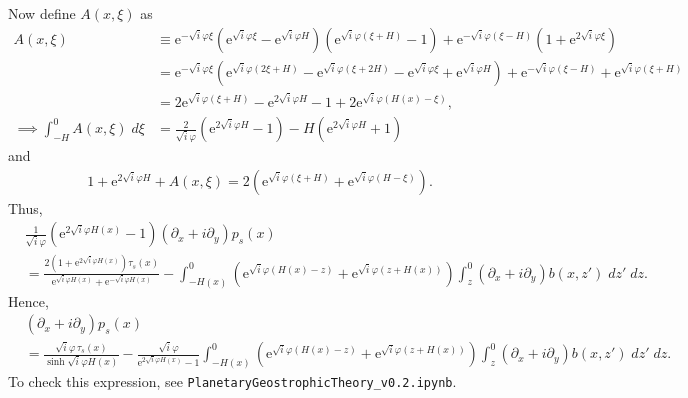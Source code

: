\documentclass[10pt]{amsart}
\begin{document}
Now define $A(x,\xi)$ as
\begin{align}
A(x,\xi) & \equiv \mathrm{e}^{-\sqrt{i} \varphi \xi} 
\left(
\mathrm{e}^{\sqrt{i} \varphi \xi} - 
\mathrm{e}^{\sqrt{i} \varphi H} 
\right) \left(
\mathrm{e}^{\sqrt{i} \varphi  \left( \xi + H \right)} - 1
\right) + \mathrm{e}^{-\sqrt{i} \varphi (\xi - H)  } 
\left( 1 + \mathrm{e}^{2 \sqrt{i} \varphi \xi}\right)   \nonumber \\
& =
\mathrm{e}^{-\sqrt{i} \varphi \xi} 
\left(
\mathrm{e}^{\sqrt{i} \varphi \left(2 \xi + H \right)} - 
\mathrm{e}^{\sqrt{i} \varphi \left(\xi + 2 H\right)}
- 
\mathrm{e}^{\sqrt{i} \varphi \xi} +
\mathrm{e}^{\sqrt{i} \varphi H} 
\right) + \mathrm{e}^{-\sqrt{i} \varphi (\xi - H)  }  + 
 \mathrm{e}^{\sqrt{i} \varphi \left( \xi + H \right)} \nonumber \\
& =
2 \mathrm{e}^{\sqrt{i} \varphi \left(\xi + H \right)} - 
\mathrm{e}^{2 \sqrt{i} \varphi  H}
- 
1 +
2 \mathrm{e}^{\sqrt{i} \varphi \left(H(x) - \xi\right)} 
\nonumber ,\\
\implies \int_{-H}^{0} A(x,\xi) \; d \xi & = 
\frac{2}{\sqrt{i} \varphi} \left( \mathrm{e}^{2 \sqrt{i} \varphi H} - 1 \right) -
 H \left( \mathrm{e}^{2 \sqrt{i} \varphi H} + 1 \right)
  \end{align}
  and
  \begin{align}
  1 + \mathrm{e}^{2 \sqrt{i} \varphi H} + A(x,\xi) = 
  2 \left( \mathrm{e}^{\sqrt{i} \varphi \left(\xi + H \right)} + \mathrm{e}^{\sqrt{i} \varphi \left(H - \xi\right)} \right) \nonumber .
  \end{align}
  Thus,
 \begin{align}
& 
 \frac{1}{\sqrt{i} \varphi} \left( \mathrm{e}^{2 \sqrt{i} \varphi H(x)} - 1 \right) 
 \left( \partial_x  + i \partial_y  \right) p_s (x) 
\nonumber \\
& = 
 \frac{2 \left(1 + \mathrm{e}^{2 \sqrt{i} \varphi H(x )} \right)  \tau_s (x)}{\mathrm{e}^{\sqrt{i} \varphi H(x)} + \mathrm{e}^{-\sqrt{i} \varphi H(x)}}
 -
\int_{-H(x)}^{0} 
\left( \mathrm{e}^{\sqrt{i} \varphi \left(H(x) - z\right)}  + \mathrm{e}^{\sqrt{i} \varphi \left(z + H(x) \right)} \right) 
 \int_{z}^{0} \left( \partial_x + i \partial_y \right)  b(x,z') \; dz' \; dz     \nonumber .
\end{align}  
Hence,
 \begin{align}
& 
 \left( \partial_x  + i \partial_y  \right) p_s (x) 
\nonumber \\
& = 
 \frac{\sqrt{i} \varphi\, \tau_s (x)} { \sinh \sqrt{i} \varphi H(x)} 
-
  \frac{\sqrt{i} \varphi} { \mathrm{e}^{2 \sqrt{i} \varphi H(x)} - 1 }
\int_{-H(x)}^{0} 
\left( \mathrm{e}^{\sqrt{i} \varphi \left(H(x) - z\right)} + \mathrm{e}^{\sqrt{i} \varphi \left(z + H(x) \right)} \right) 
 \int_{z}^{0} \left( \partial_x + i \partial_y \right)  b(x,z') \; dz' \; dz     \nonumber .
\end{align}  
To check this expression, see \texttt{PlanetaryGeostrophicTheory\_v0.2.ipynb}.
\end{document}
